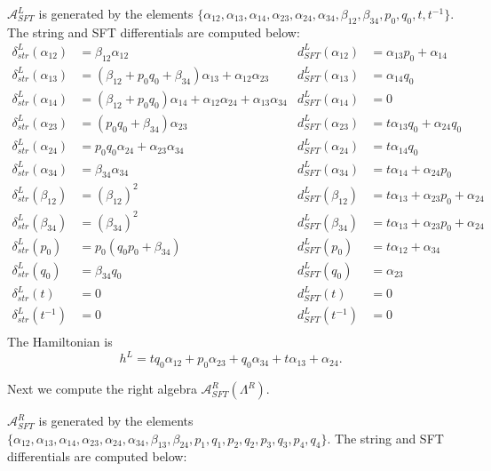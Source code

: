 \documentclass[a4paper,final, reqno]{amsart}
\theoremstyle{plain}
\theoremstyle{definition}
\newcommand{\A}{\mathcal{A}}
\begin{document}
		$\A_{SFT}^L$ is generated by the elements $\{\alpha_{12}, \alpha_{13}, \alpha_{14}, \alpha_{23}, \alpha_{24}, \alpha_{34}, \beta_{12}, \beta_{34}, p_0, q_0, t, t^{-1}\}$. The string and SFT differentials are computed below:
		\begin{align*}
			\delta_{str}^L(\alpha_{12}) &= \beta_{12}\alpha_{12} & d_{SFT}^L(\alpha_{12}) &= \alpha_{13}p_0 + \alpha_{14} \\
			\delta_{str}^L(\alpha_{13}) &= (\beta_{12}+p_0q_0+\beta_{34})\alpha_{13} + \alpha_{12}\alpha_{23} & d_{SFT}^L(\alpha_{13}) &= \alpha_{14}q_0 \\
			\delta_{str}^L(\alpha_{14}) &= (\beta_{12}+p_0q_0)\alpha_{14} + \alpha_{12}\alpha_{24} + \alpha_{13}\alpha_{34} & d_{SFT}^L(\alpha_{14}) &= 0 \\
			\delta_{str}^L(\alpha_{23}) &= (p_0q_0 + \beta_{34})\alpha_{23} & d_{SFT}^L(\alpha_{23}) &= t\alpha_{13}q_0 + \alpha_{24}q_0 \\
			\delta_{str}^L(\alpha_{24}) &= p_0q_0\alpha_{24} + \alpha_{23}\alpha_{34} & d_{SFT}^L(\alpha_{24}) &= t\alpha_{14}q_0 \\
			\delta_{str}^L(\alpha_{34}) &= \beta_{34}\alpha_{34} & d_{SFT}^L(\alpha_{34}) &= t\alpha_{14}+\alpha_{24}p_0 \\
			\delta_{str}^L(\beta_{12}) &= \left(\beta_{12}\right)^2 & d_{SFT}^L(\beta_{12}) &= t\alpha_{13} + \alpha_{23}p_0 + \alpha_{24} \\
			\delta_{str}^L(\beta_{34}) &= \left(\beta_{34}\right)^2 & d_{SFT}^L(\beta_{34}) &= t\alpha_{13} + \alpha_{23}p_0 + \alpha_{24} \\
			\delta_{str}^L(p_0) &= p_0(q_0p_0 + \beta_{34}) & d_{SFT}^L(p_0) &= t\alpha_{12} + \alpha_{34} \\
			\delta_{str}^L(q_0) &= \beta_{34}q_0 & d_{SFT}^L(q_0) &= \alpha_{23} \\
			\delta_{str}^L(t) &= 0 & d_{SFT}^L(t) &= 0 \\
			\delta_{str}^L(t^{-1}) &= 0 & d_{SFT}^L(t^{-1}) &= 0 \\
		\end{align*}
		The Hamiltonian is 
		\[h^L = tq_0\alpha_{12} + p_0\alpha_{23} + q_0\alpha_{34} + t\alpha_{13} + \alpha_{24}.\]
		
		Next we compute the right algebra $\A_{SFT}^R(\Lambda^R)$.
		
		$\A_{SFT}^R$ is generated by the elements $\{\alpha_{12}, \alpha_{13}, \alpha_{14}, \alpha_{23}, \alpha_{24}, \alpha_{34}, \beta_{13}, \beta_{24}, p_1, q_1, p_2, q_2, p_3, q_3, p_4, q_4\}$. The string and SFT differentials are computed below:
		
\end{document}
